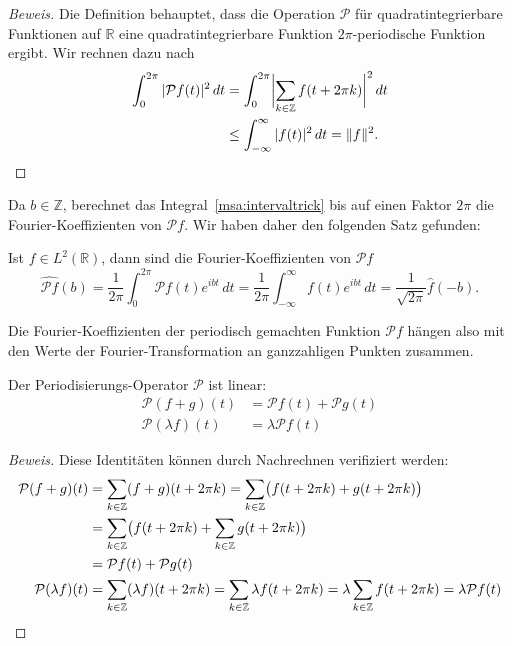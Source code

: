 \begin{proof}[Beweis]
Die Definition behauptet, dass die Operation $\mathcal{P}$ für
quadratintegrierbare Funktionen auf $\mathbb R$ eine quadratintegrierbare
Funktion $2\pi$-periodische Funktion ergibt.
Wir rechnen dazu nach
\begin{align*}
\int_{0}^{2\pi}
| \mathcal{P}f(t)|^2
\,dt
&=
\int_{0}^{2\pi}
\biggl|
\sum_{k\in\mathbb Z}f(t+2\pi k)
\biggr|^2
\,dt
\\
&\le
\int_{-\infty}^\infty |f(t)|^2 \,dt
=
\| f\|^2.
\qedhere
\end{align*}
\end{proof}

Da $b\in\mathbb Z$, berechnet das Integral~\eqref{msa:intervaltrick}
bis auf einen Faktor $2\pi$ die Fourier-Koeffizienten von $\mathcal{P}f$.
Wir haben daher den folgenden Satz gefunden:

\begin{satz}
\label{msa:Pfourier}
Ist $f\in L^2(\mathbb R)$, dann sind die Fourier-Koeffizienten von
$\mathcal{P}f$
\[
\widehat{\mathcal{P}f}(b)
=
\frac1{2\pi}\int_{0}^{2\pi} \mathcal{P}f(t) e^{ibt}\,dt
=
\frac1{2\pi}
\int_{-\infty}^\infty f(t) e^{ibt}\,dt
=
\frac{1}{\sqrt{2\pi}} \hat{f}(-b).
\]
\end{satz}

Die Fourier-Koeffizienten der periodisch gemachten Funktion $\mathcal{P}f$ 
hängen also mit den Werte der Fourier-Transformation an ganzzahligen
Punkten zusammen.

\begin{lemma}
Der Periodisierungs-Operator $\mathcal{P}$ ist linear:
\begin{align*}
\mathcal{P}(f+g)(t)
&=
\mathcal{P}f(t) + \mathcal{P}g(t)
\\
\mathcal{P}(\lambda f)(t)
&=
\lambda \mathcal{P}f(t)
\end{align*}
\end{lemma}

\begin{proof}[Beweis]
Diese Identitäten können durch Nachrechnen verifiziert werden:
\begin{align*}
\mathcal{P}(f+g)(t)
&=
\sum_{k\in\mathbb Z}(f+g)(t+2\pi k)
=
\sum_{k\in\mathbb Z}\bigl(f(t+2\pi k)+ g(t+2\pi k)\bigr)
\\
&=
\sum_{k\in\mathbb Z}\bigl(f(t+2\pi k)
+
\sum_{k\in\mathbb Z}g(t+2\pi k)\bigr)
\\
&=
\mathcal{P}f(t)
+
\mathcal{P}g(t)
\\
\mathcal{P}(\lambda f)(t)
&=
\sum_{k\in\mathbb Z}(\lambda f)(t+2\pi k)
=
\sum_{k\in\mathbb Z}\lambda f(t+2\pi k)
=
\lambda
\sum_{k\in\mathbb Z}f(t+2\pi k)
=
\lambda \mathcal{P}f(t)
\qedhere
\end{align*}
\end{proof}


